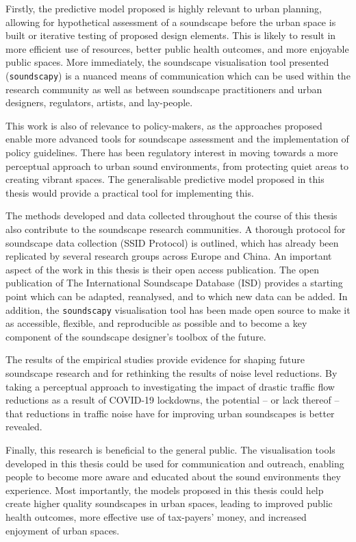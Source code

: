 \documentclass[oneside,fontsize=11pt,titlepage,chapterprefix=true
]{scrbook}
\begin{document}
Firstly, the predictive model proposed is highly relevant to urban planning, allowing for hypothetical assessment of a soundscape before the urban space is built or iterative testing of proposed design elements. This is likely to result in more efficient use of resources, better public health outcomes, and more enjoyable public spaces. More immediately, the soundscape visualisation tool presented (\texttt{soundscapy}) is a nuanced means of communication which can be used within the research community as well as between soundscape practitioners and urban designers, regulators, artists, and lay-people.

This work is also of relevance to policy-makers, as the approaches proposed enable more advanced tools for soundscape assessment and the implementation of policy guidelines. There has been regulatory interest in moving towards a more perceptual approach to urban sound environments, from protecting quiet areas to creating vibrant spaces. The generalisable predictive model proposed in this thesis would provide a practical tool for implementing this. 

The methods developed and data collected throughout the course of this thesis also contribute to the soundscape research communities. A thorough protocol for soundscape data collection (SSID Protocol) is outlined, which has already been replicated by several research groups across Europe and China. An important aspect of the work in this thesis is their open access publication. The open publication of The International Soundscape Database (ISD) provides a starting point which can be adapted, reanalysed, and to which new data can be added. In addition, the \texttt{soundscapy} visualisation tool has been made open source to make it as accessible, flexible, and reproducible as possible and to become a key component of the soundscape  designer's toolbox of the future. 

The results of the empirical studies provide evidence for shaping future soundscape research and for rethinking the results of noise level reductions. By taking a perceptual approach to investigating the impact of drastic traffic flow reductions as a result of COVID-19 lockdowns, the potential -- or lack thereof -- that reductions in traffic noise have for improving urban soundscapes is better revealed. 

Finally, this research is beneficial to the general public. The visualisation tools developed in this thesis could be used for communication and outreach, enabling people to become more aware and educated about the sound environments they experience. Most importantly, the models proposed in this thesis could help create higher quality soundscapes in urban spaces, leading to improved public health outcomes, more effective use of tax-payers' money, and increased enjoyment of urban spaces. 
\end{document}
